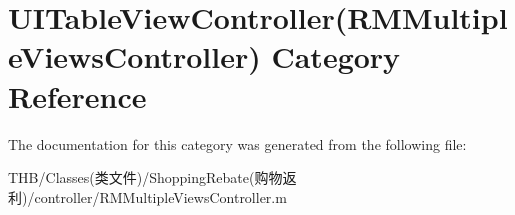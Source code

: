 \hypertarget{category_u_i_table_view_controller_07_r_m_multiple_views_controller_08}{}\section{U\+I\+Table\+View\+Controller(R\+M\+Multiple\+Views\+Controller) Category Reference}
\label{category_u_i_table_view_controller_07_r_m_multiple_views_controller_08}


The documentation for this category was generated from the following file\+:\begin{DoxyCompactItemize}
\item 
T\+H\+B/\+Classes(类文件)/\+Shopping\+Rebate(购物返利)/controller/R\+M\+Multiple\+Views\+Controller.\+m\end{DoxyCompactItemize}
